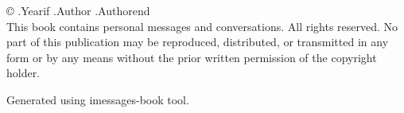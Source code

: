 \newpage

\thispagestyle{empty}

\vspace*{\fill}

\begin{flushleft}
© {{.Year}}{{if .Author}} {{.Author}}{{end}}
\\[0.5cm]

This book contains personal messages and conversations.
All rights reserved. No part of this publication may be reproduced,
distributed, or transmitted in any form or by any means without
the prior written permission of the copyright holder.

Generated using imessages-book tool.
\end{flushleft}